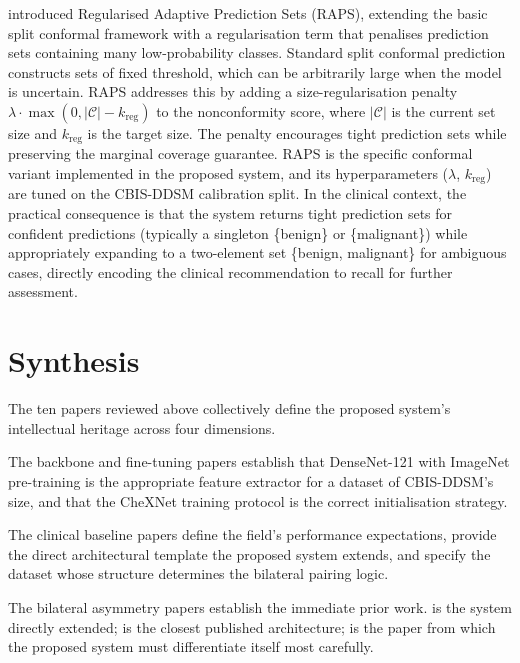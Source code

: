 \documentclass[12pt, a4paper]{article}
\begin{document}
\textcite{Romano2020} introduced Regularised Adaptive Prediction Sets (RAPS),
extending the basic split conformal framework with a regularisation term that
penalises prediction sets containing many low-probability classes.
Standard split conformal prediction constructs sets of fixed threshold,
which can be arbitrarily large when the model is uncertain.
RAPS addresses this by adding a size-regularisation penalty
$\lambda \cdot \max(0, |\mathcal{C}| - k_{\mathrm{reg}})$ to the
nonconformity score, where $|\mathcal{C}|$ is the current set size and
$k_{\mathrm{reg}}$ is the target size.
The penalty encourages tight prediction sets while preserving the
marginal coverage guarantee.
RAPS is the specific conformal variant implemented in the proposed system,
and its hyperparameters ($\lambda$, $k_{\mathrm{reg}}$) are tuned on the
CBIS-DDSM calibration split.
In the clinical context, the practical consequence is that the system
returns tight prediction sets for confident predictions (typically a
singleton \{benign\} or \{malignant\}) while appropriately expanding
to a two-element set \{benign, malignant\} for ambiguous cases, directly
encoding the clinical recommendation to recall for further assessment.

\section{Synthesis}

The ten papers reviewed above collectively define the proposed system's
intellectual heritage across four dimensions.

The backbone and fine-tuning papers \parencite{Huang2017, Rajpurkar2017}
establish that DenseNet-121 with ImageNet pre-training is the appropriate
feature extractor for a dataset of CBIS-DDSM's size, and that the
CheXNet training protocol is the correct initialisation strategy.

The clinical baseline papers \parencite{McKinney2020, Wu2019, Lee2017}
define the field's performance expectations, provide the direct
architectural template the proposed system extends, and specify the
dataset whose structure determines the bilateral pairing logic.

The bilateral asymmetry papers \parencite{Wu2020, Nguyen2019, Yang2021}
establish the immediate prior work.
\textcite{Nguyen2019} is the system directly extended;
\textcite{Wu2020} is the closest published architecture;
\textcite{Yang2021} is the paper from which the proposed system
must differentiate itself most carefully.
\end{document}
